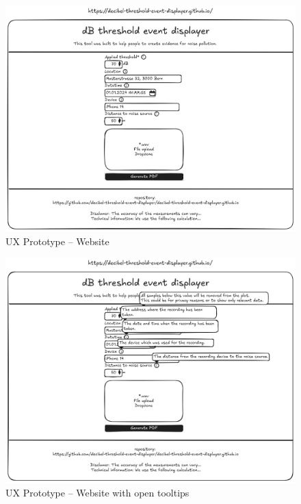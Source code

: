 \begin{figure}[H]
    \centering
    \includegraphics[width=1\textwidth]{../assets/ux_prototype_website.png}
    \caption{UX Prototype – Website}\label{fig:ux_prototype_website}
\end{figure}

\begin{figure}[H]
    \centering
    \includegraphics[width=1\textwidth]{../assets/ux_prototype_website_tooltips.png}
    \caption{UX Prototype – Website with open tooltips}\label{fig:ux_prototype_website_tooltips}
\end{figure}

